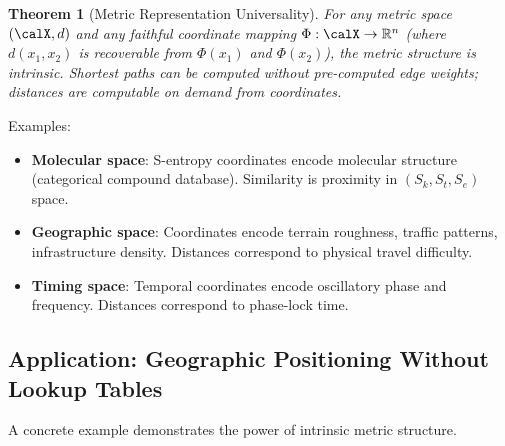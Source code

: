 \documentclass[twocolumn,11pt,a4paper]{article}
\newtheorem{theorem}{Theorem}[section]
\newcommand{\Sk}{S_{k}}
\newcommand{\St}{S_{t}}
\newcommand{\Se}{S_{e}}
\begin{document}
\begin{theorem}[Metric Representation Universality]
For any metric space $(\calX, d)$ and any faithful coordinate mapping $\Phi: \calX \to \mathbb{R}^n$ (where $d(x_1, x_2)$ is recoverable from $\Phi(x_1)$ and $\Phi(x_2)$), the metric structure is intrinsic. Shortest paths can be computed without pre-computed edge weights; distances are computable on demand from coordinates.
\end{theorem}

Examples:
\begin{itemize}[nosep,leftmargin=1em]
  \item \textbf{Molecular space}: S-entropy coordinates encode molecular structure (categorical compound database). Similarity is proximity in $(\Sk, \St, \Se)$ space.
  \item \textbf{Geographic space}: Coordinates encode terrain roughness, traffic patterns, infrastructure density. Distances correspond to physical travel difficulty.
  \item \textbf{Timing space}: Temporal coordinates encode oscillatory phase and frequency. Distances correspond to phase-lock time.
\end{itemize}

\subsection{Application: Geographic Positioning Without Lookup Tables}

A concrete example demonstrates the power of intrinsic metric structure.
\end{document}
